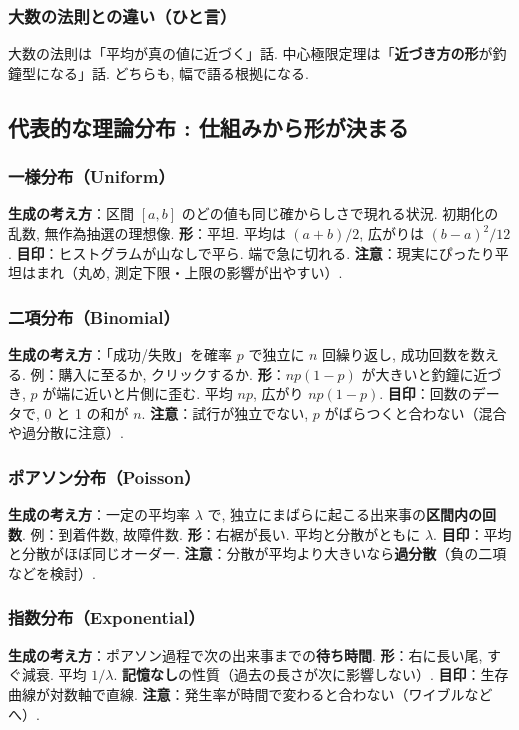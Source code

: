     \subsubsection*{大数の法則との違い（ひと言）}
      大数の法則は「平均が真の値に近づく」話.  
      中心極限定理は「\textbf{近づき方の形}が釣鐘型になる」話. どちらも, 幅で語る根拠になる.

  \subsection{代表的な理論分布 : 仕組みから形が決まる}
    \subsubsection*{一様分布（Uniform）}
      \textbf{生成の考え方}：区間 $[a,b]$ のどの値も同じ確からしさで現れる状況. 初期化の乱数, 無作為抽選の理想像.  
      \textbf{形}：平坦. 平均は $(a+b)/2$, 広がりは $(b-a)^2/12$.  
      \textbf{目印}：ヒストグラムが山なしで平ら. 端で急に切れる.  
      \textbf{注意}：現実にぴったり平坦はまれ（丸め, 測定下限・上限の影響が出やすい）.

    \subsubsection*{二項分布（Binomial）}
      \textbf{生成の考え方}：「成功/失敗」を確率 $p$ で独立に $n$ 回繰り返し, 成功回数を数える. 例：購入に至るか, クリックするか.  
      \textbf{形}：$np(1-p)$ が大きいと釣鐘に近づき, $p$ が端に近いと片側に歪む. 平均 $np$, 広がり $np(1-p)$.  
      \textbf{目印}：回数のデータで, 0 と 1 の和が $n$.  
      \textbf{注意}：試行が独立でない, $p$ がばらつくと合わない（混合や過分散に注意）.

    \subsubsection*{ポアソン分布（Poisson）}
      \textbf{生成の考え方}：一定の平均率 $\lambda$ で, 独立にまばらに起こる出来事の\textbf{区間内の回数}. 例：到着件数, 故障件数.  
      \textbf{形}：右裾が長い. 平均と分散がともに $\lambda$.  
      \textbf{目印}：平均と分散がほぼ同じオーダー.  
      \textbf{注意}：分散が平均より大きいなら\textbf{過分散}（負の二項などを検討）.

    \subsubsection*{指数分布（Exponential）}
      \textbf{生成の考え方}：ポアソン過程で次の出来事までの\textbf{待ち時間}.  
      \textbf{形}：右に長い尾, すぐ減衰. 平均 $1/\lambda$. \textbf{記憶なし}の性質（過去の長さが次に影響しない）.  
      \textbf{目印}：生存曲線が対数軸で直線.  
      \textbf{注意}：発生率が時間で変わると合わない（ワイブルなどへ）.

